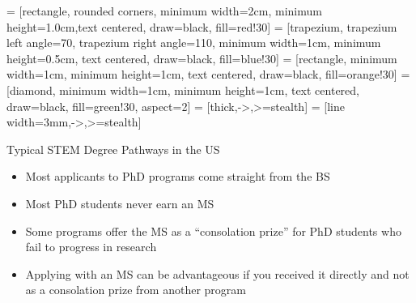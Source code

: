  = [rectangle, rounded corners, minimum width=2cm, minimum height=1.0cm,text centered, draw=black, fill=red!30]
 = [trapezium, trapezium left angle=70, trapezium right angle=110, minimum width=1cm, minimum height=0.5cm, text centered, draw=black, fill=blue!30]
 = [rectangle, minimum width=1cm, minimum height=1cm, text centered, draw=black, fill=orange!30]
 = [diamond, minimum width=1cm, minimum height=1cm, text centered, draw=black, fill=green!30, aspect=2]
 = [thick,->,>=stealth]
 = [line width=3mm,->,>=stealth]

\begin{frame}[fragile]{Typical STEM Degree Pathways in the US}
    \begin{center}
        \begin{itemize}
            \item Most applicants to PhD programs come straight from the BS
            \item Most PhD students never earn an MS
            \item Some programs offer the MS as a ``consolation prize'' for PhD students who fail to progress in research
            \item Applying with an MS can be advantageous if you received it directly and not as a consolation prize from another program
        \end{itemize}
    \end{center}
\end{frame}
